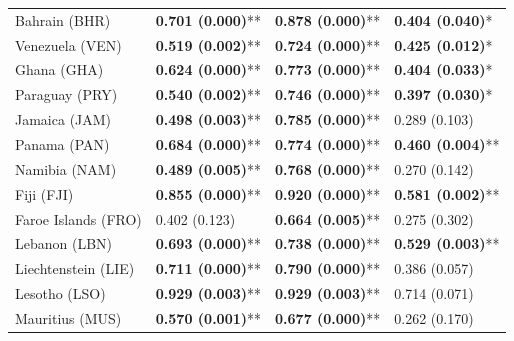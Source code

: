 \begin{longtable}{p{5cm}p{3cm}p{3cm}p{5cm}}
Bahrain (BHR) & \textcolor{atlLime600}{\textbf{0.701 (0.000)}**} & \textcolor{atlLime600}{\textbf{0.878 (0.000)}**} & \textcolor{atlLime600}{\textbf{0.404 (0.040)}*} \\
Venezuela (VEN) & \textcolor{atlLime600}{\textbf{0.519 (0.002)}**} & \textcolor{atlLime600}{\textbf{0.724 (0.000)}**} & \textcolor{atlLime600}{\textbf{0.425 (0.012)}*} \\
Ghana (GHA) & \textcolor{atlLime600}{\textbf{0.624 (0.000)}**} & \textcolor{atlLime600}{\textbf{0.773 (0.000)}**} & \textcolor{atlLime600}{\textbf{0.404 (0.033)}*} \\
Paraguay (PRY) & \textcolor{atlLime600}{\textbf{0.540 (0.002)}**} & \textcolor{atlLime600}{\textbf{0.746 (0.000)}**} & \textcolor{atlLime600}{\textbf{0.397 (0.030)}*} \\
Jamaica (JAM) & \textcolor{atlLime600}{\textbf{0.498 (0.003)}**} & \textcolor{atlLime600}{\textbf{0.785 (0.000)}**} & \textcolor{atlOrange600}{0.289 (0.103)} \\
Panama (PAN) & \textcolor{atlLime600}{\textbf{0.684 (0.000)}**} & \textcolor{atlLime600}{\textbf{0.774 (0.000)}**} & \textcolor{atlLime600}{\textbf{0.460 (0.004)}**} \\
Namibia (NAM) & \textcolor{atlLime600}{\textbf{0.489 (0.005)}**} & \textcolor{atlLime600}{\textbf{0.768 (0.000)}**} & \textcolor{atlOrange600}{0.270 (0.142)} \\
Fiji (FJI) & \textcolor{atlLime600}{\textbf{0.855 (0.000)}**} & \textcolor{atlLime600}{\textbf{0.920 (0.000)}**} & \textcolor{atlLime600}{\textbf{0.581 (0.002)}**} \\
Faroe Islands (FRO) & \textcolor{atlOrange600}{0.402 (0.123)} & \textcolor{atlLime600}{\textbf{0.664 (0.005)}**} & \textcolor{atlOrange600}{0.275 (0.302)} \\
Lebanon (LBN) & \textcolor{atlLime600}{\textbf{0.693 (0.000)}**} & \textcolor{atlLime600}{\textbf{0.738 (0.000)}**} & \textcolor{atlLime600}{\textbf{0.529 (0.003)}**} \\
Liechtenstein (LIE) & \textcolor{atlLime600}{\textbf{0.711 (0.000)}**} & \textcolor{atlLime600}{\textbf{0.790 (0.000)}**} & \textcolor{atlOrange600}{0.386 (0.057)} \\
Lesotho (LSO) & \textcolor{atlLime600}{\textbf{0.929 (0.003)}**} & \textcolor{atlLime600}{\textbf{0.929 (0.003)}**} & \textcolor{atlOrange600}{0.714 (0.071)} \\
Mauritius (MUS) & \textcolor{atlLime600}{\textbf{0.570 (0.001)}**} & \textcolor{atlLime600}{\textbf{0.677 (0.000)}**} & \textcolor{atlOrange600}{0.262 (0.170)} \\

\end{longtable}

